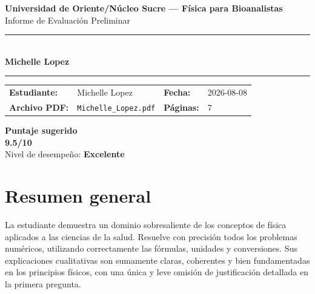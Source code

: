 \documentclass[11pt,a4paper]{article}
\begin{document}
\begin{center}
  {\Large\bfseries\color{azulTitulo} Universidad de Oriente/Núcleo Sucre --- Física para Bioanalistas}\\[4pt]
  {\large Informe de Evaluación Preliminar}\\[12pt]
  \rule{\linewidth}{1.2pt}\\[6pt]
  {\LARGE\bfseries Michelle Lopez}\\[4pt]
  \rule{\linewidth}{0.6pt}
\end{center}

\vspace{4pt}
\begin{tcolorbox}[cajaTitulo, title=Datos del informe]
\begin{tabular}{@{}llll@{}}
  \textbf{Estudiante:}  & Michelle Lopez  &
  \textbf{Fecha:}       & 2026-08-08 \\[4pt]
  \textbf{Archivo PDF:} & \texttt{Michelle\_Lopez.pdf}  &
  \textbf{Páginas:}     & 7 \\
\end{tabular}
\end{tcolorbox}

\vspace{6pt}
\begin{center}
  \begin{tcolorbox}[
    enhanced,
    colback=white, colframe=desempeno_excelente,
    width=0.62\linewidth,
    boxrule=2pt,
    halign=center, valign=center,
    top=8pt, bottom=8pt,
  ]
    \centering
    {\large\bfseries Puntaje sugerido}\\[6pt]
    {\Huge\bfseries\color{desempeno_excelente} 9.5/10}\\[6pt]
    {\large Nivel de desempeño: \textbf{\color{desempeno_excelente} Excelente}}
  \end{tcolorbox}
\end{center}

\section*{Resumen general}
La estudiante demuestra un dominio sobresaliente de los conceptos de física aplicados a las ciencias de la salud. Resuelve con precisión todos los problemas numéricos, utilizando correctamente las fórmulas, unidades y conversiones. Sus explicaciones cualitativas son sumamente claras, coherentes y bien fundamentadas en los principios físicos, con una única y leve omisión de justificación detallada en la primera pregunta.
\end{document}
